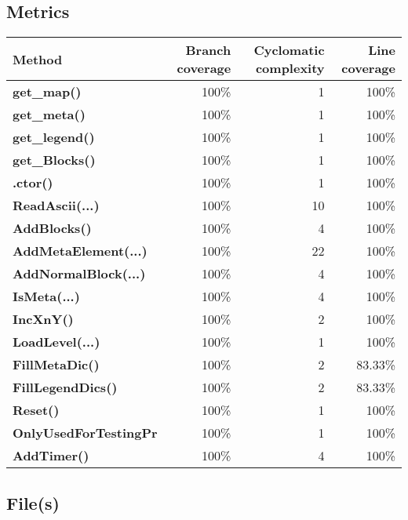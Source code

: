 \documentclass[a4paper,landscape,10pt]{article}
\begin{document}
\subsection{Metrics}
\begin{longtable}[l]{|l|r|r|r|}
\hline
\textbf{Method} & \textbf{Branch coverage} & \textbf{Cyclomatic complexity} & \textbf{Line coverage}\\
\hline
\textbf{get\_map()} & 100\% & 1 & 100\%\\
\hline
\textbf{get\_meta()} & 100\% & 1 & 100\%\\
\hline
\textbf{get\_legend()} & 100\% & 1 & 100\%\\
\hline
\textbf{get\_Blocks()} & 100\% & 1 & 100\%\\
\hline
\textbf{.ctor()} & 100\% & 1 & 100\%\\
\hline
\textbf{ReadAscii(...)} & 100\% & 10 & 100\%\\
\hline
\textbf{AddBlocks()} & 100\% & 4 & 100\%\\
\hline
\textbf{AddMetaElement(...)} & 100\% & 22 & 100\%\\
\hline
\textbf{AddNormalBlock(...)} & 100\% & 4 & 100\%\\
\hline
\textbf{IsMeta(...)} & 100\% & 4 & 100\%\\
\hline
\textbf{IncXnY()} & 100\% & 2 & 100\%\\
\hline
\textbf{LoadLevel(...)} & 100\% & 1 & 100\%\\
\hline
\textbf{FillMetaDic()} & 100\% & 2 & 83.33\%\\
\hline
\textbf{FillLegendDics()} & 100\% & 2 & 83.33\%\\
\hline
\textbf{Reset()} & 100\% & 1 & 100\%\\
\hline
\textbf{OnlyUsedForTestingPr} & 100\% & 1 & 100\%\\
\hline
\textbf{AddTimer()} & 100\% & 4 & 100\%\\
\hline
\end{longtable}
\subsection{File(s)}
\end{document}
